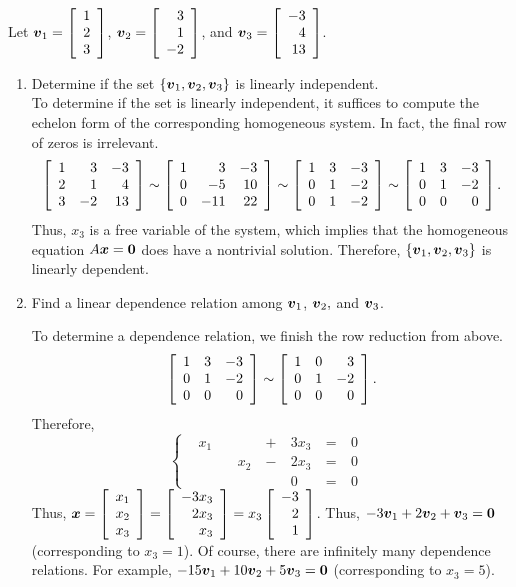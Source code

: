 \begin{Exam}\label{exam:lineardependent} Let $\bb v_1 = \vr{1 \\ 2 \\3}$, $\bb v_2 = \vr{3\\1\\-2}$, and $\bb v_3 = \vr{-3\\4\\13}$.\\

\begin{enumerate}
\item Determine if the set $\{\bb v_1, \bb v_2, \bb v_3\}$ is linearly independent.\\

To determine if the set is linearly independent, it suffices to compute the echelon form of the corresponding homogeneous system. In fact, the final row of zeros is irrelevant.
\[\mtx{rrr}{1&3&-3\\2&1&4\\3&-2&13} \sim \mtx{rrr}{1&3&-3\\0&-5&10\\0&-11&22 } \sim \mtx{rrr}{1&3&-3\\0&1&-2\\0&1&-2 }\sim \mtx{rrr}{1&3&-3\\0&1&-2\\0&0&0 }.\] Thus, $x_3$ is a free variable of the system, which implies that the homogeneous equation $A\bb x = \bb 0$ does have a nontrivial solution. Therefore, $\{\bb v_1, \bb v_2, \bb v_3\}$ is linearly dependent.\\

\item Find a linear dependence relation among $\bb v_1$, $\bb v_2,$ and $\bb v_3$.

To determine a dependence relation, we finish the row reduction from above.
\[\mtx{rrr}{1&3&-3\\0&1&-2\\0&0&0 } \sim \mtx{rrr}{1&0&3\\0&1&-2\\0&0&0 }.\] Therefore, 
\[\left\{\begin{alignedat}{100}
&x_1\ && & +\ &3x_3\ &=\ &0&\\
&&& x_2\ & -\ &2x_3\ &=\ &0&\\
&&&&&0\ &=\ &0&
\end{alignedat}\right. 
\] Thus, $\bb x = \vr{x_1\\x_2\\x_3} = \vr{-3x_3\\2x_3 \\ x_3} = x_3\vr{-3\\2\\1}$. Thus, $-3\bb v_1 +2 \bb v_2 + \bb v_3 = \bb 0$ (corresponding to $x_3=1$). Of course, there are infinitely many dependence relations. For example, $-15\bb v_1 + 10\bb v_2 + 5\bb v_3 = \bb 0$ (corresponding to $x_3 = 5$).\\


\end{enumerate}
\end{Exam}
